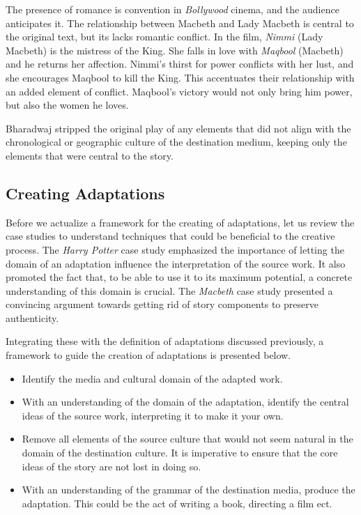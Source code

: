 \documentclass[12pt]{article}
\begin{document}
The presence of romance is convention in \textit{Bollywood} cinema, and the
audience anticipates it. The relationship between Macbeth and Lady Macbeth is
central to the original text, but its lacks romantic conflict. In the film, 
\textit{Nimmi} (Lady Macbeth) is the mistress of the King. She falls
in love with \textit{Maqbool} (Macbeth) and he returns her affection. 
Nimmi's thirst for power conflicts with her lust, and she encourages 
Maqbool to kill the King. This accentuates their 
relationship with an added element of conflict. Maqbool's
victory would not only bring him power, but also the women he loves. 

Bharadwaj stripped the original play of 
any elements that did not align with the chronological or geographic culture of 
the destination medium, keeping only the elements that were central to the story.

\pagebreak

\subsection*{Creating Adaptations}
Before we actualize a framework for the creating of adaptations, let us review the
case studies to understand techniques that could be beneficial to the creative
process. The \textit{Harry Potter} case study emphasized the importance of
letting the domain of an adaptation influence the interpretation of the source
work. It also promoted the fact that, to be able to use it to its maximum
potential, a concrete understanding of this domain is crucial. The
\textit{Macbeth} case study presented a convincing argument towards getting rid
of story components to preserve authenticity.

Integrating these with the definition of adaptations discussed previously, a
framework to guide the creation of adaptations is presented below.
\begin{itemize}
\item Identify the media and cultural domain of the adapted work.
\item With an understanding of the domain of the adaptation, identify the
central ideas of the source work, interpreting it to make it your own.
\item Remove all elements of the source culture that would not seem natural in
the domain of the destination culture. It is imperative to ensure that the core
ideas of the story are not lost in doing so.
\item With an understanding of the grammar of the destination media, produce 
the adaptation. This could be the act of writing a book, directing a film ect.
\end{itemize}
\end{document}
